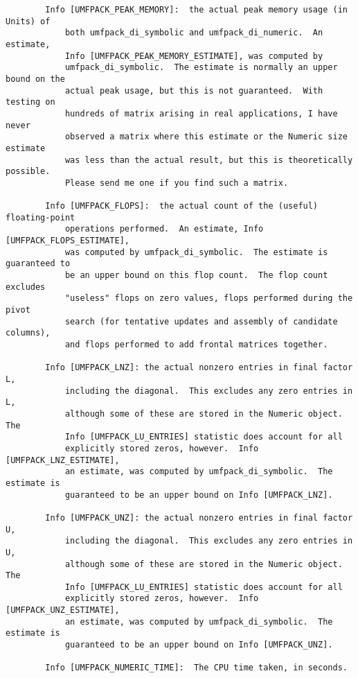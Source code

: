 \documentclass[11pt]{article}
\begin{document}
{\begin{verbatim}
        Info [UMFPACK_PEAK_MEMORY]:  the actual peak memory usage (in Units) of
            both umfpack_di_symbolic and umfpack_di_numeric.  An estimate,
            Info [UMFPACK_PEAK_MEMORY_ESTIMATE], was computed by
            umfpack_di_symbolic.  The estimate is normally an upper bound on the
            actual peak usage, but this is not guaranteed.  With testing on
            hundreds of matrix arising in real applications, I have never
            observed a matrix where this estimate or the Numeric size estimate
            was less than the actual result, but this is theoretically possible.
            Please send me one if you find such a matrix.

        Info [UMFPACK_FLOPS]:  the actual count of the (useful) floating-point
            operations performed.  An estimate, Info [UMFPACK_FLOPS_ESTIMATE],
            was computed by umfpack_di_symbolic.  The estimate is guaranteed to
            be an upper bound on this flop count.  The flop count excludes
            "useless" flops on zero values, flops performed during the pivot
            search (for tentative updates and assembly of candidate columns),
            and flops performed to add frontal matrices together.

        Info [UMFPACK_LNZ]: the actual nonzero entries in final factor L,
            including the diagonal.  This excludes any zero entries in L,
            although some of these are stored in the Numeric object.  The
            Info [UMFPACK_LU_ENTRIES] statistic does account for all
            explicitly stored zeros, however.  Info [UMFPACK_LNZ_ESTIMATE],
            an estimate, was computed by umfpack_di_symbolic.  The estimate is
            guaranteed to be an upper bound on Info [UMFPACK_LNZ].

        Info [UMFPACK_UNZ]: the actual nonzero entries in final factor U,
            including the diagonal.  This excludes any zero entries in U,
            although some of these are stored in the Numeric object.  The
            Info [UMFPACK_LU_ENTRIES] statistic does account for all
            explicitly stored zeros, however.  Info [UMFPACK_UNZ_ESTIMATE],
            an estimate, was computed by umfpack_di_symbolic.  The estimate is
            guaranteed to be an upper bound on Info [UMFPACK_UNZ].

        Info [UMFPACK_NUMERIC_TIME]:  The CPU time taken, in seconds.
\end{verbatim}
}

\newpage
\end{document}

